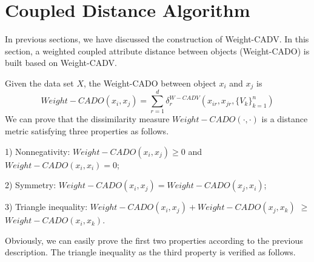 \documentclass[review]{elsarticle}
\begin{document}
\section{Coupled Distance Algorithm}
In previous sections, we have discussed the construction of Weight-CADV. In this section, a weighted coupled attribute distance between objects (Weight-CADO) is built based on Weight-CADV.

Given the data set $X$, the Weight-CADO between object $x_i$ and $x_j$ is
\begin{equation}
Weight-CADO(x_i,x_j) = \sum_{r=1}^{d}\delta_r^{W-CADV}(x_{ir},x_{jr},\{V_k\}_{k = 1} ^ n)
\label{equ20}
\end{equation}
We can prove that the dissimilarity measure $Weight-CADO(\cdot,\cdot)$ is a distance metric satisfying three properties as follows.

1) Nonnegativity: $Weight-CADO(x_i,x_j) \geq 0$ and $Weight-CADO(x_i,x_i) = 0$;

2) Symmetry: $Weight-CADO(x_i,x_j) = Weight-CADO(x_j,x_i)$;

3) Triangle inequality: $Weight-CADO(x_i,x_j) + Weight-CADO(x_j,x_k)$ $\geq$ $Weight-CADO(x_i,x_k)$.

Obviously, we can easily prove the first two properties according to the previous description. The triangle inequality as the third property is verified as follows.
\end{document}
